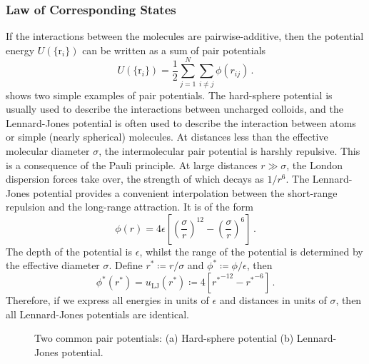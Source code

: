 \documentclass{article}
\theoremstyle{plain}\theoremheaderfont{\normalfont\bfseries}\theorembodyfont{\rmfamily}\theoremseparator{.}\newtheorem*{thm}{Theorem}\newtheorem*{law}{Law}\newtheorem*{pos}{Postulate}
\numberwithin{equation}{section}
\newcommand{\vb}[1]{\bm{\mathrm{#1}}}
\begin{document}
    \subsubsection{Law of Corresponding States}
    If the interactions between the molecules are pairwise-additive, then the potential energy \(U(\{\vb{r}_i\})\) can be written as a sum of pair potentials
    \begin{equation}
        U(\{\vb{r}_i\})=\frac{1}{2}\sum_{j=1}^{N}\sum_{i\ne j}\phi(r_{ij})\,.
    \end{equation}
     shows two simple examples of pair potentials. The hard-sphere potential is usually used to describe the interactions between uncharged colloids, and the Lennard-Jones potential is often used to describe the interaction between atoms or simple (nearly spherical) molecules. At distances less than the effective molecular diameter \(\sigma\), the intermolecular pair potential is harshly repulsive. This is a consequence of the Pauli principle. At large distances \(r\gg\sigma\), the London dispersion forces take over, the strength of which decays as \(1/r^6\). The Lennard-Jones potential provides a convenient interpolation between the short-range repulsion and the long-range attraction. It is of the form
    \begin{equation}
        \phi(r)=4\epsilon\left[\left(\frac{\sigma}{r}\right)^{12}-\left(\frac{\sigma}{r}\right)^6\right]\,.
    \end{equation}
    The depth of the potential is \(\epsilon\), whilst the range of the potential is determined by the effective diameter \(\sigma\). Define \(r^*\coloneqq r/\sigma\) and \(\phi^*\coloneqq \phi/\epsilon\), then
    \begin{equation}
        \phi^*(r^*)=u_{\text{LJ}}(r^*)\coloneqq 4\left[{r^*}^{-12}-{r^*}^{-6}\right]\,.
    \end{equation}
    Therefore, if we express all energies in units of \(\epsilon\) and distances in units of \(\sigma\), then all Lennard-Jones potentials are identical.

    \begin{figure}
        \centering
        \caption{Two common pair potentials: (a) Hard-sphere potential (b) Lennard-Jones potential.}
        \label{Fig:pair_potentials}
    \end{figure}
\end{document}

